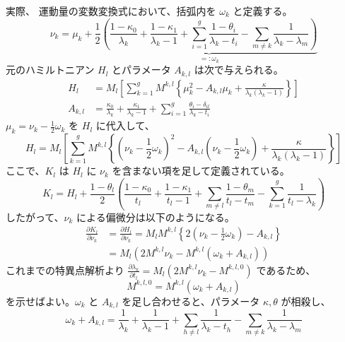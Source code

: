 \documentclass[paper=a4, fontsize=11pt]{jlreq} %
\theoremstyle{break}
\theoremstyle{qa}
\begin{document}
実際、
運動量の変数変換式において、括弧内を $\omega_k$ と定義する。
\begin{equation*}
    \nu_k = \mu_k + \frac{1}{2} \underbrace{\left( \frac{1-\kappa_0}{\lambda_k} + \frac{1-\kappa_1}{\lambda_k-1} + \sum_{i=1}^g \frac{1-\theta_i}{\lambda_k-t_i} - \sum_{m \neq k} \frac{1}{\lambda_k-\lambda_m} \right)}_{=: \omega_k}
\end{equation*}
元のハミルトニアン $H_l$ とパラメータ $A_{k,l}$ は次で与えられる。
\begin{align*}
    H_l &= M_l \left[ \sum_{k=1}^g M^{k,l} \left\{ \mu_k^2 - A_{k,l} \mu_k + \frac{\kappa}{\lambda_k(\lambda_k-1)} \right\} \right] \\
    A_{k,l} &= \frac{\kappa_0}{\lambda_k} + \frac{\kappa_1}{\lambda_k-1} + \sum_{i=1}^g \frac{\theta_i - \delta_{il}}{\lambda_k-t_i}
\end{align*}
$\mu_k = \nu_k - \frac{1}{2}\omega_k$ を $H_l$ に代入して、
\begin{equation*}
    H_l = M_l \left[ \sum_{k=1}^g M^{k,l} \left\{ \left(\nu_k - \frac{1}{2}\omega_k\right)^2 - A_{k,l} \left(\nu_k - \frac{1}{2}\omega_k\right) + \frac{\kappa}{\lambda_k(\lambda_k-1)} \right\} \right]
\end{equation*}
ここで、$K_l$ は $H_l$ に $\nu_k$ を含まない項を足して定義されている。
\begin{equation*}
    K_l = H_l + \frac{1-\theta_l}{2} \left( \frac{1-\kappa_0}{t_l} + \frac{1-\kappa_1}{t_l-1} + \sum_{m \neq l} \frac{1-\theta_m}{t_l-t_m} - \sum_{k=1}^g \frac{1}{t_l-\lambda_k} \right)
\end{equation*}
したがって、$\nu_k$ による偏微分は以下のようになる。
\begin{align*}
    \frac{\partial K_l}{\partial \nu_k} &= \frac{\partial H_l}{\partial \nu_k} = M_l M^{k,l} \left\{ 2\left(\nu_k - \frac{1}{2}\omega_k\right) - A_{k,l} \right\} \\
    &= M_l \left( 2 M^{k,l} \nu_k - M^{k,l}(\omega_k + A_{k,l}) \right)
\end{align*}
これまでの特異点解析より $\frac{\partial \lambda_k}{\partial t_l} = M_l(2 M^{k,l} \nu_k - M^{k,l,0})$ であるため、
\begin{equation*}
    M^{k,l,0} = M^{k,l}(\omega_k + A_{k,l})
\end{equation*}
を示せばよい。$\omega_k$ と $A_{k,l}$ を足し合わせると、パラメータ $\kappa, \theta$ が相殺し、
\begin{equation*}
    \omega_k + A_{k,l} = \frac{1}{\lambda_k} + \frac{1}{\lambda_k-1} + \sum_{h \neq l} \frac{1}{\lambda_k-t_h} - \sum_{m \neq k} \frac{1}{\lambda_k-\lambda_m}
\end{equation*}
\end{document}
